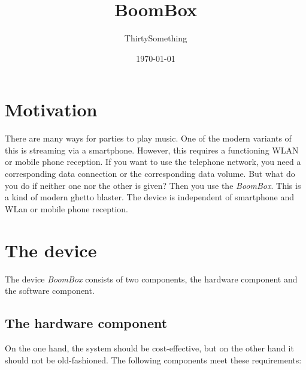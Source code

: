 \documentclass[12pt,a4paper]{article}
\author{ThirtySomething}
\title{BoomBox}
\date{\today}
\newcommand{\bb}{\textit{BoomBox}}
\begin{document}
\clearpage\maketitle
\thispagestyle{empty}
\newpage

\tableofcontents
{}
\newpage

\section{Motivation}
There are many ways for parties to play music. One of the modern variants of this is streaming via a smartphone. However, this requires a functioning WLAN or
mobile phone reception. If you want to use the telephone network, you need a corresponding data connection or the corresponding data volume. But what do you do
if neither one nor the other is given? Then you use the \bb{}. This is a kind of modern ghetto blaster. The device is independent of smartphone and WLan or
mobile phone reception.

\section{The device}
The device \bb{} consists of two components, the hardware component and the software component.

\subsection{The hardware component}
On the one hand, the system should be cost-effective, but on the other hand it should not be old-fashioned. The following components meet these requirements:
\end{document}
